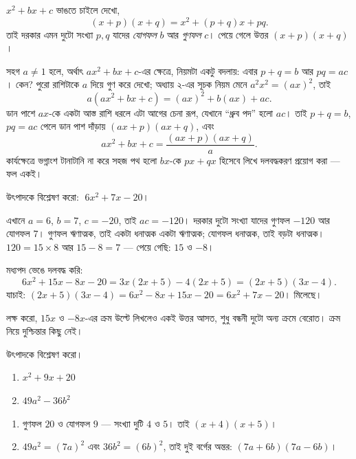 \documentclass[11pt]{article}
\begin{document}
\begin{idea}[মধ্যপদ বিশ্লেষণ কেন কাজ করে]
$x^{2} + bx + c$ ভাঙতে চাইলে দেখো,
\[
  (x + p)(x + q) = x^{2} + (p + q)x + pq .
\]
তাই দরকার এমন দুটো সংখ্যা $p, q$ যাদের \emph{যোগফল} $b$ আর \emph{গুণফল} $c$।
পেয়ে গেলে উত্তর $(x+p)(x+q)$।

সহগ $a \neq 1$ হলে, অর্থাৎ $ax^{2} + bx + c$-এর ক্ষেত্রে, নিয়মটা একটু বদলায়:
এবার $p + q = b$ আর $pq = ac$। কেন? পুরো রাশিটাকে $a$ দিয়ে গুণ করে দেখো;
অধ্যায় ২-এর সূচক নিয়ম মেনে $a^{2}x^{2} = (ax)^{2}$, তাই
\[
  a(ax^{2} + bx + c) = (ax)^{2} + b(ax) + ac .
\]
ডান পাশে $ax$-কে একটা আস্ত রাশি ধরলে এটা আগের চেনা রূপ, যেখানে ``ধ্রুব পদ'' হলো
$ac$। তাই $p+q = b$, $pq = ac$ পেলে ডান পাশ দাঁড়ায় $(ax+p)(ax+q)$, এবং
\[
  ax^{2} + bx + c = \frac{(ax+p)(ax+q)}{a} .
\]
কার্যক্ষেত্রে ভগ্নাংশ টানাটানি না করে সহজ পথ হলো $bx$-কে $px + qx$ হিসেবে লিখে
দলবদ্ধকরণ প্রয়োগ করা --- ফল একই।
\end{idea}

\begin{example}
উৎপাদকে বিশ্লেষণ করো: $\;6x^{2} + 7x - 20$।
\end{example}

\begin{solbox}
এখানে $a = 6$, $b = 7$, $c = -20$, তাই $ac = -120$। দরকার দুটো সংখ্যা যাদের
গুণফল $-120$ আর যোগফল $7$। গুণফল ঋণাত্মক, তাই একটা ধনাত্মক একটা ঋণাত্মক; যোগফল
ধনাত্মক, তাই বড়টা ধনাত্মক। $120 = 15 \times 8$ আর $15 - 8 = 7$ --- পেয়ে গেছি:
$15$ ও $-8$।

মধ্যপদ ভেঙে দলবদ্ধ করি:
\[
  6x^{2} + 15x - 8x - 20 = 3x(2x + 5) - 4(2x + 5) = (2x + 5)(3x - 4).
\]
যাচাই: $(2x+5)(3x-4) = 6x^{2} - 8x + 15x - 20 = 6x^{2} + 7x - 20$। মিলেছে।

লক্ষ করো, $15x$ ও $-8x$-এর ক্রম উল্টে লিখলেও একই উত্তর আসত, শুধু বন্ধনী দুটো
অন্য ক্রমে বেরোত। ক্রম নিয়ে দুশ্চিন্তার কিছু নেই।
\end{solbox}

 উৎপাদকে বিশ্লেষণ করো।
\begin{enumerate}
  \item $x^{2} + 9x + 20$
  \item $49a^{2} - 36b^{2}$
\end{enumerate}

\begin{sol}
\begin{enumerate}
  \item গুণফল $20$ ও যোগফল $9$ --- সংখ্যা দুটি $4$ ও $5$। তাই $(x+4)(x+5)$।
  \item $49a^{2} = (7a)^{2}$ এবং $36b^{2} = (6b)^{2}$, তাই দুই বর্গের অন্তর:
        $(7a + 6b)(7a - 6b)$।
\end{enumerate}
\end{sol}
\end{document}
